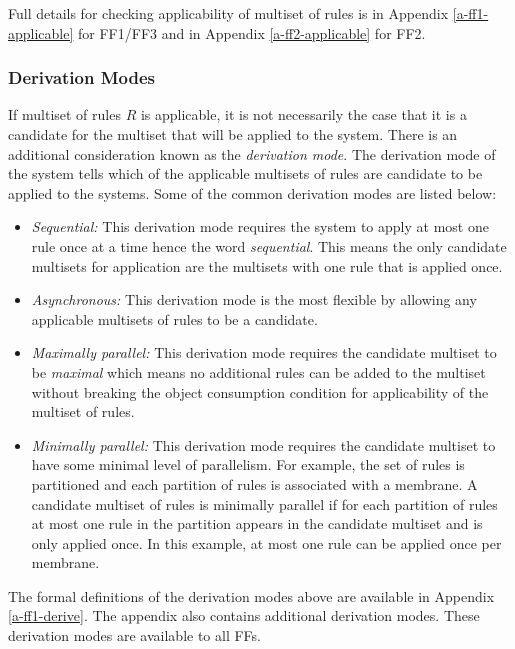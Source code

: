 \documentclass{article}
\begin{document}
Full details for checking applicability of multiset of rules is in Appendix \ref{a-ff1-applicable}
for FF1/FF3 and in Appendix \ref{a-ff2-applicable} for FF2.

\subsubsection{Derivation Modes}

If multiset of rules $R$ is applicable, it is not necessarily the case that it is a candidate for
the multiset that will be applied to the system. There is an additional consideration known as the 
\emph{derivation mode}. The derivation mode of the system tells which of the applicable multisets 
of rules are candidate to be applied to the systems. Some of the common derivation modes are listed
below: 

\begin{itemize}
\item \emph{Sequential:} This derivation mode requires the system to apply at most one rule once at
       a time hence the word \emph{sequential}. This means the only candidate multisets for 
       application are the multisets with one rule that is applied once.
\item \emph{Asynchronous:} This derivation mode is the most flexible by allowing any applicable 
       multisets of rules to be a candidate.
\item \emph{Maximally parallel:} This derivation mode requires the candidate multiset to be 
      \emph{maximal} which means no additional rules can be added to the multiset without breaking 
      the object consumption condition for applicability of the multiset of rules.
\item \emph{Minimally parallel:} This derivation mode requires the candidate multiset to have some
       minimal level of parallelism. For example, the set of rules is partitioned and each partition
       of rules is associated with a membrane. A candidate multiset of rules is minimally parallel
       if for each partition of rules at most one rule in the partition appears in the candidate 
       multiset and is only applied once. In this example, at most one rule can be applied once per
       membrane. 
\end{itemize}

The formal definitions of the derivation modes above are available in Appendix \ref{a-ff1-derive}.
The appendix also contains additional derivation modes. These derivation modes are available to all
FFs.
\end{document}
